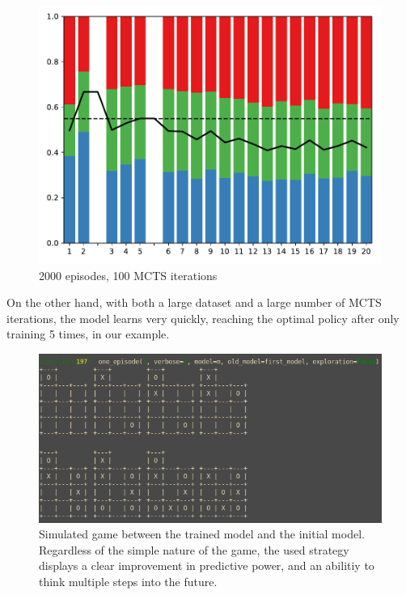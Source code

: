 \documentclass[12pt]{article}
\begin{document}
\begin{figure}[h!]
    \centering
    \includegraphics[width=.5\textwidth]{plots/4.pdf}
    \caption{2000 episodes, 100 MCTS iterations}
\end{figure}

On the other hand, with both a large dataset and a large number of MCTS
iterations, the model learns very quickly, reaching the optimal policy after
only training 5 times, in our example.

\begin{figure}[h!]
    \centering
    \includegraphics[width=.8\textwidth]{plots/tictactoe.png}
    \caption{Simulated game between the trained model and the initial model.
        Regardless of the simple nature of the game, the used strategy displays
        a clear improvement in predictive power, and an abilitiy to think multiple
    steps into the future.}
\end{figure}
\end{document}
